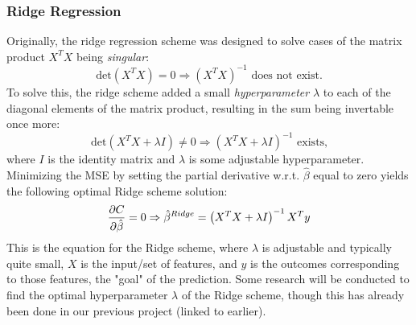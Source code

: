         \subsubsection{Ridge Regression}
            Originally, the ridge regression scheme was designed to solve cases of the matrix product $X^TX$ being \textit{singular}:
            \begin{equation}
                \text{det} \left(X^TX \right) = 0 \Rightarrow \left( X^TX \right)^{-1} \text{ does not exist.}
            \end{equation}
            To solve this, the ridge scheme added a small \textit{hyperparameter} $\lambda$ to each of the diagonal elements of the matrix product, resulting in the sum being invertable once more:
            \begin{equation}
                \text{det} \left(X^TX +\lambda I \right) \neq 0 \Rightarrow \left(X^TX +\lambda I \right)^{-1} \text{ exists,}
            \end{equation}
            where $I$ is the identity matrix and $\lambda$ is some adjustable hyperparameter. Minimizing the MSE by setting the partial derivative w.r.t. $\hat{\beta}$ equal to zero yields the following optimal Ridge scheme solution:
            \begin{equation}
                \pdv{C}{\hat{\beta}}=0\Rightarrow \hat{\beta}^{Ridge} = \left( X^TX + \lambda I \right)^{-1}X^Ty
            \end{equation}
            This is the equation for the Ridge scheme, where $\lambda$ is adjustable and typically quite small, $X$ is the input/set of features, and $y$ is the outcomes corresponding to those features, the "goal" of the prediction.
            Some research will be conducted to find the optimal hyperparameter $\lambda$ of the Ridge scheme, though this has already been done in our previous project (linked to earlier).
            
